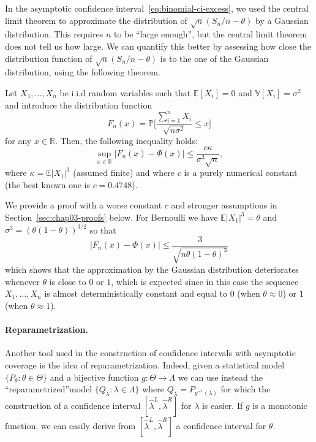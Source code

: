 \documentclass[
	fontsize=11pt, %
	twoside=false, %
	numbers=noenddot, %
]{kaobook}
\renewcommand{\P}{\mathbb P}
\newcommand{\E}{\mathbb E}
\newcommand{\R}{\mathbb R}
\newcommand{\var}{\mathbb V}
\newcommand{\wh}{\widehat}
\newcommand{\goes}{\rightarrow}
\begin{document}
In the asymptotic confidence interval~\eqref{eq:binomial-ci-excess}, we used the central limit theorem to approximate the distribution of $\sqrt n(S_n / n - \theta)$ by a Gaussian distribution.
This requires $n$ to be ``large enough'', but the central limit theorem does not tell us how large.
We can quantify this better by assessing how close the distribution function of $\sqrt n(S_n / n - \theta)$ is to the one of the Gaussian distribution, using the following theorem.
\begin{theorem}
	\label{thm:berry-esseen}
	Let $X_1, \ldots, X_n$ be i.i.d random variables such that $\E [X_i] = 0$ and $\var[X_i] = \sigma^2$ and introduce the distribution function%
	\begin{equation*}
		F_n(x) = \P \bigg[ \frac{\sum_{i=1}^n X_i}{\sqrt{n \sigma^2}} \leq x \bigg]
	\end{equation*}
	for any $x \in \R$. Then, the following inequality holds:
	\begin{equation*}
		\sup_{x \in \R} |F_n(x) - \Phi(x)| \leq \frac{c \kappa}{\sigma^3 \sqrt n},
	\end{equation*}
	where $\kappa = \E |X_1|^3$ (assumed finite) and where $c$ is a purely numerical constant (the best known one is $c = 0.4748$).
\end{theorem}
We provide a proof with a worse constant $c$ and stronger assumptions in Section~\ref{sec:chap03-proofs} below.
For Bernoulli we have $\E|X_1|^3 = \theta$ and $\sigma^3 = (\theta(1 - \theta))^{3/2}$ so that 
\begin{equation*}
	|F_n(x) - \Phi(x)| \leq \frac{3}{\sqrt{n \theta (1 - \theta)^3}}
\end{equation*}
which shows that the approximation by the Gaussian distribution deteriorates whenever $\theta$ is close to $0$ or $1$, which is expected since in this case the sequence $X_1, \ldots, X_n$ is almost deterministically constant and equal to $0$ (when $\theta \approx 0$) or $1$ (when $\theta \approx 1$).

\paragraph{Reparametrization.} %

Another tool used in the construction of confidence intervals with asymptotic coverage is the idea of reparametrization.
Indeed, given a statistical model $\{ P_\theta : \theta \in \Theta \}$ and a bijective function $g : \Theta \goes \Lambda$ we can use instead the ``reparametrized''model $\{ Q_\lambda : \lambda \in \Lambda \}$ where $Q_\lambda = P_{g^{-1}(\lambda)}$ for which the construction of a confidence interval $[\wh \lambda^L, \wh \lambda^R]$ for $\lambda$ is easier.
If $g$ is a monotonic function, we can easily derive from $[\wh \lambda^L, \wh \lambda^R]$ a confidence interval for $\theta$.
\end{document}
